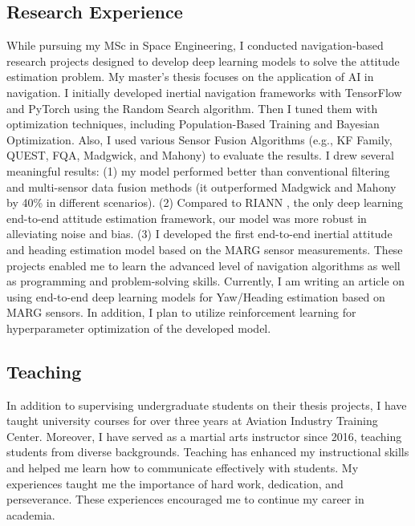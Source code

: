 \documentclass[a4,25pt]{article}
\begin{document}
\begin{large}
\subsection{Research Experience}
\quad While pursuing my MSc in Space Engineering, I conducted navigation-based research projects designed to develop deep learning models to solve the attitude estimation problem. My master's thesis focuses on the application of AI in navigation. I initially developed inertial navigation frameworks with TensorFlow and PyTorch using the Random Search algorithm. Then I tuned them with optimization techniques, including Population-Based Training and Bayesian Optimization. Also, I used various Sensor Fusion Algorithms (e.g., KF Family, QUEST, FQA, Madgwick, and Mahony) to evaluate the results. I drew several meaningful results: (1) my model performed better than conventional filtering and multi-sensor data fusion methods (it outperformed Madgwick \cite{madgwick2010efficient} and Mahony \cite{euston2008complementary} by 40\% in different scenarios). (2) Compared to RIANN \cite{weber2021riann}, the only deep learning end-to-end attitude estimation framework, our model was more robust in alleviating noise and bias. (3) I developed the first end-to-end inertial attitude and heading estimation model based on the MARG sensor measurements. These projects enabled me to learn the advanced level of navigation algorithms as well as programming and problem-solving skills. Currently, I am writing an article on using end-to-end deep learning models for Yaw/Heading estimation based on MARG sensors. In addition, I plan to utilize reinforcement learning for hyperparameter optimization of the developed model.
\subsection{Teaching}
\quad In addition to supervising undergraduate students on their thesis projects, I have taught university courses for over three years at Aviation Industry Training Center. Moreover, I have served as a martial arts instructor since 2016, teaching students from diverse backgrounds. Teaching has enhanced my instructional skills and helped me learn how to communicate effectively with students. My experiences taught me the importance of hard work, dedication, and perseverance. These experiences encouraged me to continue my career in academia.\par

\end{large}
\end{document}
